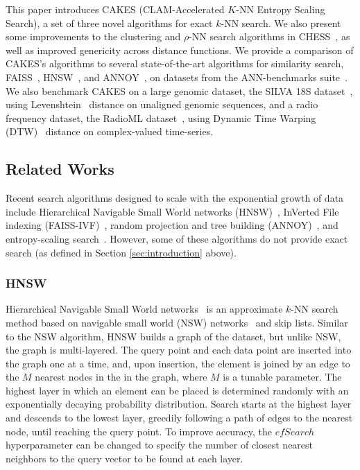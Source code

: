 This paper introduces CAKES (CLAM-Accelerated $K$-NN Entropy Scaling Search), a set of three novel algorithms for exact $k$-NN search.
We also present some improvements to the clustering and $\rho$-NN search algorithms in CHESS~\cite{ishaq2019clustered}, as well as improved genericity across distance functions.
We provide a comparison of CAKES's algorithms to several state-of-the-art algorithms for similarity search, FAISS~\cite{johnson2019billion}, HNSW~\cite{malkov2016hnsw}, and ANNOY~\cite{annoy}, on datasets from the ANN-benchmarks suite~\cite{aumuller2020ann}.
We also benchmark CAKES on a large genomic dataset, the SILVA 18S dataset~\cite{10.1093/nar/gks1219}, using Levenshtein~\cite{levenshtein1966binary} distance on unaligned genomic sequences, and a radio frequency dataset, the RadioML dataset~\cite{oshea2018radioml}, using Dynamic Time Warping (DTW)~\cite{gold2018dynamic} distance on complex-valued time-series.


\subsection{Related Works}
\label{sec:intoduction:related-works}

Recent search algorithms designed to scale with the exponential growth of data include Hierarchical Navigable Small World networks (HNSW)~\cite{Malkov2016EfficientAR}, InVerted File indexing (FAISS-IVF)~\cite{faissivf}, random projection and tree building (ANNOY)~\cite{annoy}, and entropy-scaling search~\cite{yu2015entropy, ishaq2019clustered}. However, some of these algorithms do not provide exact search (as defined in Section \ref{sec:introduction} above).


\subsubsection{HNSW}
\label{sec:introduction:related-works:hnsw}

Hierarchical Navigable Small World networks~\cite{Malkov2016EfficientAR} is an approximate $k$-NN search method based on navigable small world (NSW) networks~\cite{kleinberg2000navigation, boguna2009navigability} and skip lists. 
Similar to the NSW algorithm, HNSW builds a graph of the dataset, but unlike NSW, the graph is multi-layered.
The query point and each data point are inserted into the graph one at a time, and, upon insertion, the element is joined by an edge to the $M$ nearest nodes in the in the graph, where $M$ is a tunable parameter. 
The highest layer in which an element can be placed is determined randomly with an exponentially decaying probability distribution.
Search starts at the highest layer and descends to the lowest layer, greedily following a path of edges to the nearest node, until reaching the query point. 
To improve accuracy, the $efSearch$ hyperparameter can be changed to specify the number of closest nearest neighbors to the query vector to be found at each layer. 


